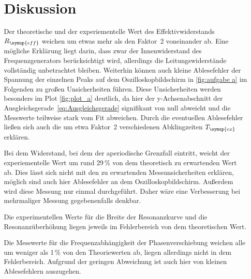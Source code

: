 \section{Diskussion}
\label{sec:Diskussion}
Der theoretische und der experiementelle Wert des Effektivwiderstands $R_{\symup{eff}}$ weichen um etwas mehr als den Faktor~2
voneinander ab. Eine mögliche Erklärung liegt darin, dass zwar der Innenwiderstand des Frequenzgenerators berücksichtigt wird, allerdings
die Leitungswiderstände vollständig unbetrachtet bleiben. Weiterhin können auch kleine Ablesefehler der Spannung der einzelnen Peaks auf
dem Oszilloskopbildschirm in \autoref{fig:aufgabe a} im Folgenden zu großen Unsicherheiten führen.
Diese Unsicherheiten werden besonders im Plot \autoref{fig:plot_a} deutlich, da hier der y-Achsenabschnitt der 
Ausgleichsgerade~\eqref{eq:Ausgleichsgerade} signifikant von null abweicht und die Messwerte teilweise stark vom Fit abweichen.
Durch die eventuellen Ablesefehler ließen sich auch die um etwa Faktor~2 verschiedenen Abklingzeiten $T_{\symup{ex}}$ erklären.

Bei dem Widerstand, bei dem der aperiodische Grenzfall eintritt, weicht der experiementelle Wert um rund 29\,\% von dem theoretisch zu 
erwartenden Wert ab. Dies lässt sich nicht mit den zu erwartenden Messunsicherheiten erklären, möglich sind auch hier Ablesefehler
an dem Oszilloskopbildschirm. Außerdem wird diese Messung nur einmal durchgeführt. Daher wäre eine Verbesserung bei mehrmaliger Messung
gegebenenfalls denkbar.

Die experimentellen Werte für die Breite der Resonanzkurve und die Resonanzüberhöhung liegen jeweils im Fehlerbereich von dem theoretischen
Wert.

Die Messwerte für die Frequenzabhängigkeit der Phasenverschiebung weichen alle um weniger als 1\,\% von den Theoriewerten ab, liegen 
allerdings nicht in dem Fehlerbereich. Aufgrund der geringen Abweichung ist auch hier von kleinen Ablesefehlern auszugehen.
